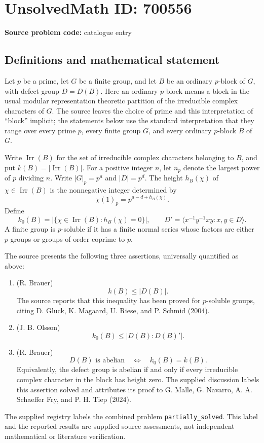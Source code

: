 \documentclass[11pt]{article}
\begin{document}
\section*{UnsolvedMath ID: 700556}
\textbf{Source problem code:} catalogue entry
\subsection{Definitions and mathematical statement}
Let \(p\) be a prime, let \(G\) be a finite group, and let \(B\) be an ordinary \(p\)-block of \(G\), with defect group \(D=D(B)\). Here an ordinary \(p\)-block means a block in the usual modular representation theoretic partition of the irreducible complex characters of \(G\). The source leaves the choice of prime and this interpretation of ``block'' implicit; the statements below use the standard interpretation that they range over every prime \(p\), every finite group \(G\), and every ordinary \(p\)-block \(B\) of \(G\).

Write \(\operatorname{Irr}(B)\) for the set of irreducible complex characters belonging to \(B\), and put \(k(B)=|\operatorname{Irr}(B)|\). For a positive integer \(n\), let \(n_p\) denote the largest power of \(p\) dividing \(n\). Write \(|G|_p=p^a\) and \(|D|=p^d\). The height \(h_B(\chi)\) of \(\chi\in\operatorname{Irr}(B)\) is the nonnegative integer determined by
\[
\chi(1)_p=p^{a-d+h_B(\chi)}.
\]
Define
\[
k_0(B)=\bigl|\{\chi\in\operatorname{Irr}(B):h_B(\chi)=0\}\bigr|,
\qquad
D'=\langle x^{-1}y^{-1}xy:x,y\in D\rangle.
\]
A finite group is \(p\)-soluble if it has a finite normal series whose factors are either \(p\)-groups or groups of order coprime to \(p\).

The source presents the following three assertions, universally quantified as above:
\begin{enumerate}
\item[(a)] \textup{(R. Brauer)}
\[
k(B)\leq |D(B)|.
\]
The source reports that this inequality has been proved for \(p\)-soluble groups, citing D. Gluck, K. Magaard, U. Riese, and P. Schmid (2004).
\item[(b)] \textup{(J. B. Olsson)}
\[
k_0(B)\leq |D(B):D(B)'|.
\]
\item[(c)] \textup{(R. Brauer)}
\[
D(B)\text{ is abelian}\quad\Longleftrightarrow\quad k_0(B)=k(B).
\]
Equivalently, the defect group is abelian if and only if every irreducible complex character in the block has height zero. The supplied discussion labels this assertion solved and attributes its proof to G. Malle, G. Navarro, A. A. Schaeffer Fry, and P. H. Tiep (2024).
\end{enumerate}
The supplied registry labels the combined problem \texttt{partially\_solved}. This label and the reported results are supplied source assessments, not independent mathematical or literature verification.
\end{document}
